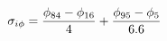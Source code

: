 \documentclass[10pt]{article}
\begin{document}
\[\sigma_{i\phi} = {\phi_{84} - \phi_{16} \over 4} + {\phi_{95} - \phi_{5} \over 6.6}
\]
\end{document}
